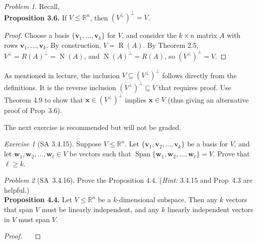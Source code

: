 \documentclass[fleqn,11pt]{paper}
\theoremstyle{remark}
\newtheorem{problem}{Problem}
\newtheorem*{exercise}{Exercise}
\newtheorem*{solution}{{\bf Solution}}
\newcommand\R{\fld{R}}
\newcommand{\vR}{\ensuremath{\operatorname{R}}}
\newcommand{\vN}{\ensuremath{\operatorname{N}}}
\renewcommand{\vec}[1]{\mathbf{#1}}
\newcommand{\<}{\ensuremath{\langle}}
\renewcommand{\>}{\ensuremath{\rangle}}
\newcommand\fld[1]{\ensuremath{\mathbb{#1}}}
\newcommand\vv{\vec{v}}
\newcommand\vw{\vec{w}}
\newcommand\vx{\vec{x}}
\newcommand\Span{\ensuremath{\operatorname{Span}}}
\begin{document}

\newpage

\begin{problem} %
Recall,\\[4pt]
{\bf Proposition 3.6.} If $V \leq \R^n$, then $(V^\bot)^\bot= V$.
\begin{proof}
Choose a basis $\{\vv_1,\dots, \vv_k\}$ for $V$, and consider the 
$k \times n$ matrix $A$ with rows $\vv_1,\dots, \vv_k$. 
By construction, $V = \vR(A)$. By Theorem 2.5, $V^\bot = R(A)^\bot = \vN(A)$, 
and $\vN(A)^\bot = R(A)$, so $(V^\bot)^\bot = V$.
\end{proof}
As mentioned in lecture, the inclusion $V \subseteq (V^\bot)^\bot$ follows directly from the 
definitions.  It is the reverse inclusion $(V^\bot)^\bot \subseteq V$ that requires proof.
Use Theorem 4.9 to show that $\vx \in (V^\bot)^\bot$ implies $\vx \in V$ (thus giving
an alternative proof of Prop~3.6).
\end{problem}


\newpage

\noindent The next exercise is recommended but will not be graded.

\begin{exercise}[SA 3.4.15] 
Suppose $V \leq \R^n$. Let $\{\vv_1,\vv_2, \dots, \vv_k\}$ be a basis for $V$, and let 
$\vw_1,\vw_2, \dots, \vw_\ell \in V$ be vectors such that 
$\Span \{\vw_1, \vw_2, \dots, \vw_\ell\} = V$. Prove that $\ell \geq k$.
\end{exercise}

\newpage

\begin{problem}[SA~3.4.16]
Prove the Proposition 4.4. ({\it Hint:} 3.4.15 and Prop~4.3 are helpful.)  \\[4pt]
{\bf Proposition 4.4.} 
Let $V \leq \R^n$ be a $k$-dimensional subspace. 
Then any $k$ vectors that span $V$ must be linearly independent, 
and any $k$ linearly independent vectors in $V$ must span $V$.
\begin{proof}\
~
  \vfill
\end{proof}
\end{problem}
\newpage
\end{document}
